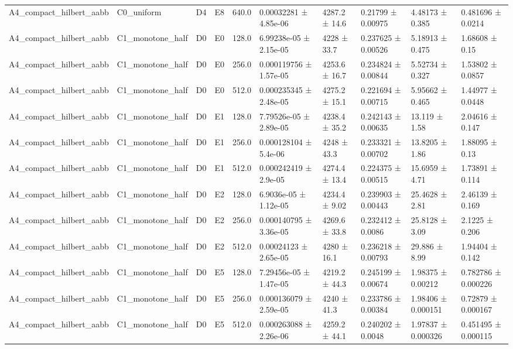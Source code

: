 \begin{table}
\begin{tabular}{llllllllll}
A4\_compact\_hilbert\_aabb & C0\_uniform & D4 & E8 & 640.0 & 0.00032281 ± 4.85e-06 & 4287.2 ± 14.6 & 0.21799 ± 0.00975 & 4.48173 ± 0.385 & 0.481696 ± 0.0214 \\
A4\_compact\_hilbert\_aabb & C1\_monotone\_half & D0 & E0 & 128.0 & 6.99238e-05 ± 2.15e-05 & 4228 ± 33.7 & 0.237625 ± 0.00526 & 5.18913 ± 0.475 & 1.68608 ± 0.15 \\
A4\_compact\_hilbert\_aabb & C1\_monotone\_half & D0 & E0 & 256.0 & 0.000119756 ± 1.57e-05 & 4253.6 ± 16.7 & 0.234824 ± 0.00844 & 5.52734 ± 0.327 & 1.53802 ± 0.0857 \\
A4\_compact\_hilbert\_aabb & C1\_monotone\_half & D0 & E0 & 512.0 & 0.000235345 ± 2.48e-05 & 4275.2 ± 15.1 & 0.221694 ± 0.00715 & 5.95662 ± 0.465 & 1.44977 ± 0.0448 \\
A4\_compact\_hilbert\_aabb & C1\_monotone\_half & D0 & E1 & 128.0 & 7.79526e-05 ± 2.89e-05 & 4238.4 ± 35.2 & 0.242143 ± 0.00635 & 13.119 ± 1.58 & 2.04616 ± 0.147 \\
A4\_compact\_hilbert\_aabb & C1\_monotone\_half & D0 & E1 & 256.0 & 0.000128104 ± 5.4e-06 & 4248 ± 43.3 & 0.233321 ± 0.00702 & 13.8205 ± 1.86 & 1.88095 ± 0.13 \\
A4\_compact\_hilbert\_aabb & C1\_monotone\_half & D0 & E1 & 512.0 & 0.000242419 ± 2.9e-05 & 4274.4 ± 13.4 & 0.224375 ± 0.00515 & 15.6959 ± 4.71 & 1.73891 ± 0.114 \\
A4\_compact\_hilbert\_aabb & C1\_monotone\_half & D0 & E2 & 128.0 & 6.9036e-05 ± 1.12e-05 & 4234.4 ± 9.02 & 0.239903 ± 0.00443 & 25.4628 ± 2.81 & 2.46139 ± 0.169 \\
A4\_compact\_hilbert\_aabb & C1\_monotone\_half & D0 & E2 & 256.0 & 0.000140795 ± 3.36e-05 & 4269.6 ± 33.8 & 0.232412 ± 0.0086 & 25.8128 ± 3.09 & 2.1225 ± 0.206 \\
A4\_compact\_hilbert\_aabb & C1\_monotone\_half & D0 & E2 & 512.0 & 0.00024123 ± 2.65e-05 & 4280 ± 16.1 & 0.236218 ± 0.00793 & 29.886 ± 8.99 & 1.94404 ± 0.142 \\
A4\_compact\_hilbert\_aabb & C1\_monotone\_half & D0 & E5 & 128.0 & 7.29456e-05 ± 1.47e-05 & 4219.2 ± 44.3 & 0.245199 ± 0.00674 & 1.98375 ± 0.00212 & 0.782786 ± 0.000226 \\
A4\_compact\_hilbert\_aabb & C1\_monotone\_half & D0 & E5 & 256.0 & 0.000136079 ± 2.59e-05 & 4240 ± 41.3 & 0.233786 ± 0.00384 & 1.98406 ± 0.000151 & 0.72879 ± 0.000167 \\
A4\_compact\_hilbert\_aabb & C1\_monotone\_half & D0 & E5 & 512.0 & 0.000263088 ± 2.26e-06 & 4259.2 ± 44.1 & 0.240202 ± 0.0048 & 1.97837 ± 0.000326 & 0.451495 ± 0.000115 \\

\end{tabular}
\end{table}
